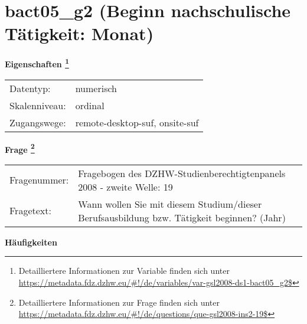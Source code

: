 
    \setcounter{footnote}{0}

    \vspace*{-1.8cm}
	\section{bact05\_g2 (Beginn nachschulische Tätigkeit: Monat)}
	\label{section:bact05_g2}



    \vspace*{0.5cm}
    \noindent\textbf{Eigenschaften
	\footnote{Detailliertere Informationen zur Variable finden sich unter
		\url{https://metadata.fdz.dzhw.eu/\#!/de/variables/var-gsl2008-ds1-bact05_g2$}}}\\
	\begin{tabularx}{\hsize}{@{}lX}
	Datentyp: & numerisch \\
	Skalenniveau: & ordinal \\
	Zugangswege: &
	  remote-desktop-suf, 
	  onsite-suf
 \\
    \end{tabularx}



				\vspace*{0.5cm}
                \noindent\textbf{Frage
	                \footnote{Detailliertere Informationen zur Frage finden sich unter
		              \url{https://metadata.fdz.dzhw.eu/\#!/de/questions/que-gsl2008-ins2-19$}}}\\
				\begin{tabularx}{\hsize}{@{}lX}
					Fragenummer: &
					  Fragebogen des DZHW-Studienberechtigtenpanels 2008 - zweite Welle:
					  19
 \\
					Fragetext: & Wann wollen Sie mit diesem Studium/dieser Berufsausbildung bzw. Tätigkeit beginnen? (Jahr) \\
				\end{tabularx}





        		\vspace*{0.5cm}
                \noindent\textbf{Häufigkeiten}

